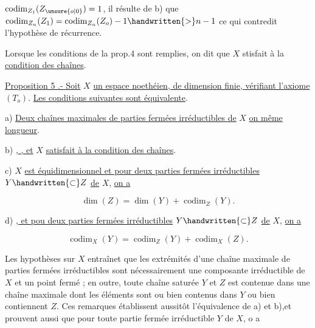 $\operatorname{codim}_{Z_1}(Z_{\unsure{o|0}})=1$, il résulte de b) que $\operatorname{codim}_{Z_n}(Z_1)=\operatorname{codim}_{Z_n}(Z_o)-1\handwritten{>}n-1$ ce qui contredit l'hypothèse de récurrence.

Lorsque les conditions de la prop.4 sont remplies, on dit que $X$ stisfait à la \uline{condition des chaînes}.

\uline{Proposition 5 .- Soit} $X$ \uline{un espace noethéien, de dimension finie, vérifiant l'axiome} $(T_o)$. \uline{Les conditions suivantes sont équivalente}.

a) \uline{Deux chaînes maximales de parties fermées irréductibles de} $X$ \uline{on même longueur}.

b) \uline{ , , et} $X$ \uline{satisfait à la condition des chaînes}.

c)  $X$ \uline{est équidimensionnel et pour deux parties fermées irréductibles} $Y\handwritten{\subset}Z$ \uline{de} $X$, \uline{on a}

\[
 \dim(Z)=\dim(Y)+\operatorname{codim}_Z(Y).\tag*{(4)}
\]

d)  \uline{, et pou deux parties fermées irréductibles} $Y\handwritten{\subset}Z$ \uline{de} $X$, \uline{on a}

\[
 \operatorname{codim}_X(Y)=\operatorname{codim}_Z(Y)+\operatorname{codim}_X(Z).\tag*{(5)}
\]


Les hypothèses sur $X$ entraînet que les extrémités d'une chaîne maximale de parties fermées irréductibles sont nécessairement une composante irréductible de $X$ et un point fermé ; en outre, toute chaîne saturée   $Y$ et $Z$  est contenue dans une chaîne maximale dont les éléments  sont ou bien contenus dans $Y$ ou bien contiennent $Z$. Ces remarques établissent aussitôt l'équivalence de a) et b),et prouvent aussi que  pour toute partie fermée irréductible $Y$ de $X$, o a

